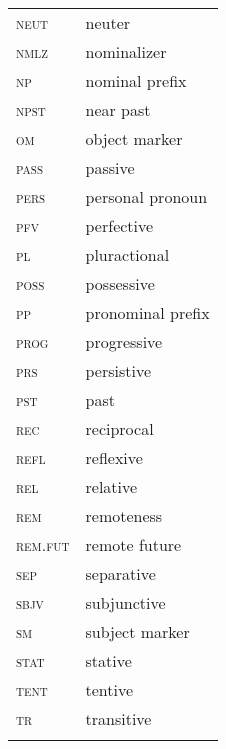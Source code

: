 \begin{tabularx}{.5\textwidth}{lQ@{}}
\textsc{neut} & neuter\\
\textsc{nmlz} & nominalizer\\
\textsc{np} & nominal prefix\\
\textsc{npst} & near past\\
\textsc{om} & object marker\\
\textsc{pass} & passive\\
\textsc{pers} & personal pronoun\\
\textsc{pfv} & perfective\\
\textsc{pl} & pluractional\\
\textsc{poss} & possessive\\
\textsc{pp} & pronominal prefix\\
\textsc{prog} & progressive\\
\textsc{prs} & persistive\\
\textsc{pst} & past\\
\textsc{rec} & reciprocal\\
\textsc{refl} & reflexive\\
\textsc{rel} & relative\\
\textsc{rem} & remoteness\\
\textsc{rem}.\textsc{fut} & remote future\\
\textsc{sep} & separative\\
\textsc{sbjv} & subjunctive\\
\textsc{sm} & subject marker\\
\textsc{stat} & stative\\
\textsc{tent} & tentive\\
\textsc{tr} & transitive\\
\\
 \end{tabularx}
